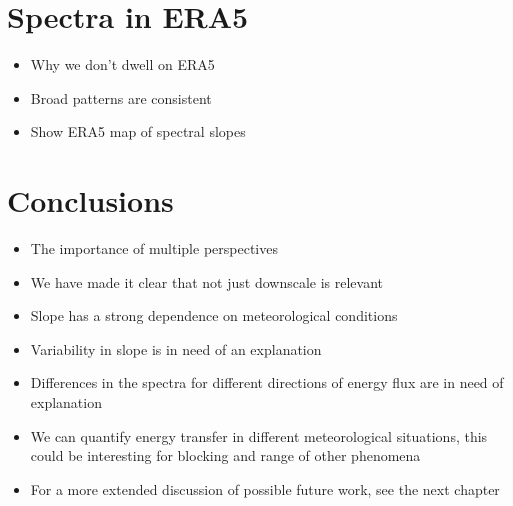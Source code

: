 \section{Spectra in ERA5}

\begin{itemize}

\item{Why we don't dwell on ERA5}

\item{Broad patterns are consistent}

\item{Show ERA5 map of spectral slopes}

\end{itemize}

\section{Conclusions}

\begin{itemize}

\item{The importance of multiple perspectives}

\item{We have made it clear that not just downscale is relevant}

\item{Slope has a strong dependence on meteorological conditions}

\item{Variability in slope is in need of an explanation}

\item{Differences in the spectra for different directions of energy flux are in need of explanation}

\item{We can quantify energy transfer in different meteorological situations, this could be interesting for blocking and range of other phenomena}

\item{For a more extended discussion of possible future work, see the next chapter}

\end{itemize}




